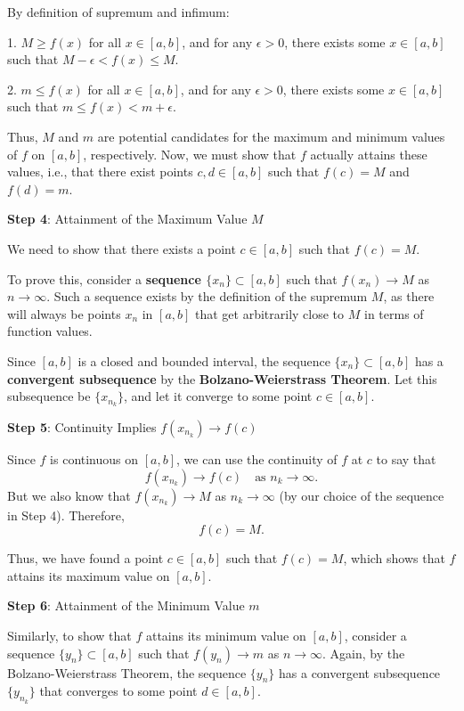\documentclass[a4paper,12pt]{book}
\begin{document}
By definition of supremum and infimum:

1. \( M \geqslant f(x) \) for all \( x \in [a, b] \), and for any \(\epsilon > 0\), there exists some \( x \in [a, b] \) such that \( M - \epsilon < f(x) \leqslant M \).

2. \( m \leqslant f(x) \) for all \( x \in [a, b] \), and for any \(\epsilon > 0\), there exists some \( x \in [a, b] \) such that \( m \leqslant f(x) < m + \epsilon \).

Thus, \( M \) and \( m \) are potential candidates for the maximum and minimum values of \( f \) on \([a, b]\), respectively. Now, we must show that \( f \) actually attains these values, i.e., that there exist points \( c, d \in [a, b] \) such that \( f(c) = M \) and \( f(d) = m \).

\textbf{Step 4}: Attainment of the Maximum Value \( M \)

We need to show that there exists a point \( c \in [a, b] \) such that \( f(c) = M \).

To prove this, consider a \textbf{sequence \( \{x_n\} \subset [a, b] \)} such that \( f(x_n) \to M \) as \( n \to \infty \). Such a sequence exists by the definition of the supremum \( M \), as there will always be points \( x_n \) in \([a, b]\) that get arbitrarily close to \( M \) in terms of function values.

Since \([a, b]\) is a closed and bounded interval, the sequence \( \{x_n\} \subset [a, b] \) has a \textbf{convergent subsequence} by the \textbf{Bolzano-Weierstrass Theorem}. Let this subsequence be \( \{x_{n_k}\} \), and let it converge to some point \( c \in [a, b] \).

\textbf{Step 5}: Continuity Implies \( f(x_{n_k}) \to f(c) \)

Since \( f \) is continuous on \([a, b]\), we can use the continuity of \( f \) at \( c \) to say that
\[
f(x_{n_k}) \to f(c) \quad \text{as } n_k \to \infty.
\]
But we also know that \( f(x_{n_k}) \to M \) as \( n_k \to \infty \) (by our choice of the sequence in Step 4). Therefore,
\[
f(c) = M.
\]

Thus, we have found a point \( c \in [a, b] \) such that \( f(c) = M \), which shows that \( f \) attains its maximum value on \([a, b]\).

\textbf{Step 6}: Attainment of the Minimum Value \( m \)

Similarly, to show that \( f \) attains its minimum value on \([a, b]\), consider a sequence \( \{y_n\} \subset [a, b] \) such that \( f(y_n) \to m \) as \( n \to \infty \). Again, by the Bolzano-Weierstrass Theorem, the sequence \( \{y_n\} \) has a convergent subsequence \( \{y_{n_k}\} \) that converges to some point \( d \in [a, b] \).
\end{document}
